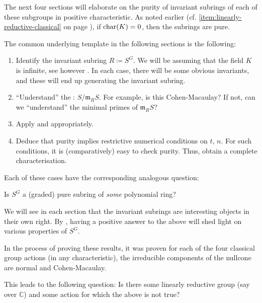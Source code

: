 \documentclass[12pt]{article}
\begin{document}
The next four sections will elaborate on the purity of invariant subrings of each of these subgroups in positive characteristic. As noted earlier (cf. \ref{item:linearly-reductive-classical} on page \pageref{item:linearly-reductive-classical}), if $\operatorname{char}(K) = 0$, then the subrings are pure.

The common underlying template in the following sections is the following:
\begin{enumerate}[label=\textsc{Step} \arabic*.]
	\item Identify the invariant subring $R \coloneqq S^{G}$. We will be assuming that the field $K$ is infinite, see however . In each case, there will be some obvious invariants, and these will end up generating the invariant subring.
	\item ``Understand'' the : $S/\mathfrak{m}_{R}S$. For example, is this Cohen-Macaulay? If not, can we ``understand'' the minimal primes of $\mathfrak{m}_{R}S$?
	\item Apply  and  appropriately.
	\item Deduce that purity implies restrictive numerical conditions on $t$, $n$. For such conditions, it is (comparatively) easy to check purity. Thus, obtain a complete characterisation.
\end{enumerate}

\begin{rem}
	Each of these cases have the corresponding analogous question: 
	\begin{center}
		Is $S^{G}$ a (graded) pure subring of \emph{some} polynomial ring? 
	\end{center}
	We will see in each section that the invariant subrings are interesting objects in their own right. By , having a positive answer to the above will shed light on various properties of $S^{G}$.
\end{rem}

\begin{rem}
	In the process of proving these results, it was proven for each of the four classical group actions (in any characteristic), the irreducible components of the nullcone are normal and Cohen-Macaulay.

	This leads to the following question: Is there some linearly reductive group (say over $\mathbb{C}$) and some action for which the above is not true? 
\end{rem}
\end{document}
